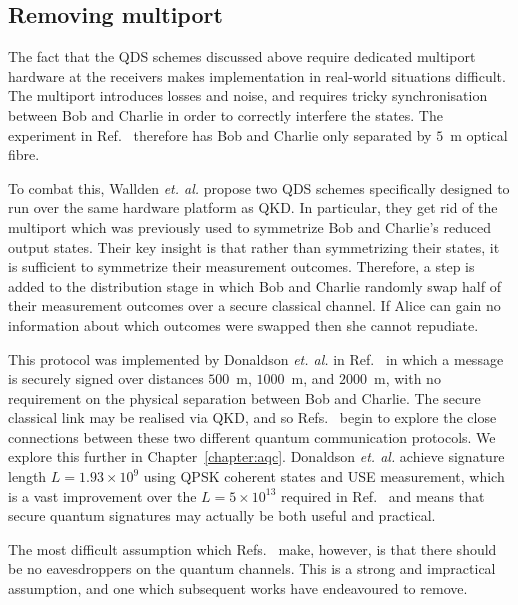 \subsection{Removing multiport}

The fact that the QDS schemes discussed above require dedicated multiport hardware at the receivers makes implementation in real-world situations difficult. The multiport introduces losses and noise, and requires tricky synchronisation between Bob and Charlie in order to correctly interfere the states. The experiment in Ref.~\cite{Collins2014} therefore has Bob and Charlie only separated by $5$~m optical fibre. 

To combat this, Wallden \emph{et. al.} \cite{Wallden2015} propose two QDS schemes specifically designed to run over the same hardware platform as QKD. In particular, they get rid of the multiport which was previously used to symmetrize Bob and Charlie's reduced output states. Their key insight is that rather than symmetrizing their states, it is sufficient to symmetrize their measurement outcomes. Therefore, a step is added to the distribution stage in which Bob and Charlie randomly swap half of their measurement outcomes over a secure classical channel. If Alice can gain no information about which outcomes were swapped then she cannot repudiate. 

This protocol was implemented by Donaldson \emph{et. al.} in Ref.~\cite{Donaldson2016} in which a message is securely signed over distances $500$~m, $1000$~m, and $2000$~m, with no requirement on the physical separation between Bob and Charlie. The secure classical link may be realised via QKD, and so Refs.~\cite{Wallden2015, Donaldson2016} begin to explore the close connections between these two different quantum communication protocols. We explore this further in Chapter~\ref{chapter:aqc}. Donaldson \emph{et. al.} achieve signature length $L = 1.93 \times 10^9$ using QPSK coherent states and USE measurement, which is a vast improvement over the $L = 5 \times 10^{13}$ required in Ref.~\cite{Collins2014} and means that secure quantum signatures may actually be both useful and practical. 

The most difficult assumption which Refs.~\cite{Andersson2006, Clarke2012, Dunjko2014, Collins2014} make, however, is that there should be no eavesdroppers on the quantum channels. This is a strong and impractical assumption, and one which subsequent works have endeavoured to remove.

